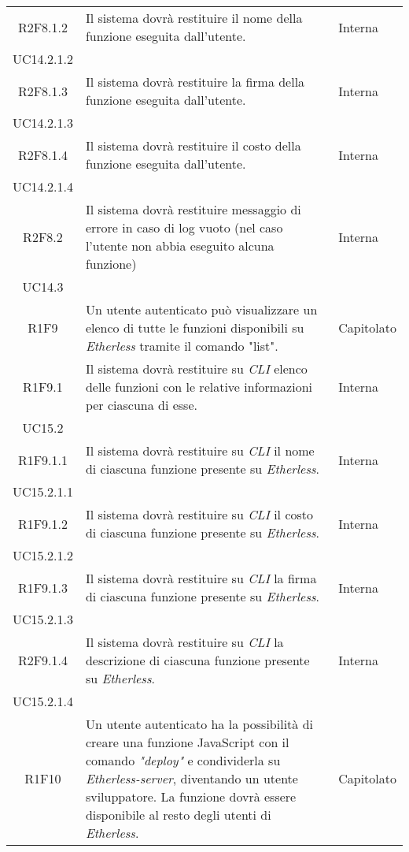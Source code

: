 \begin{longtable}{|c|p{8cm}|C{2cm}|}
	R2F8.1.2 &  Il sistema dovrà restituire il nome della funzione eseguita dall'utente. & \centering Interna \\ UC14.2.1.2 \tabularnewline

	R2F8.1.3 &  Il sistema dovrà restituire la firma della funzione eseguita dall'utente. & \centering Interna \\ UC14.2.1.3 \tabularnewline

	R2F8.1.4 &  Il sistema dovrà restituire il costo della funzione eseguita dall'utente. & \centering Interna \\ UC14.2.1.4 \tabularnewline

	R2F8.2 &  Il sistema dovrà restituire messaggio di errore in caso di log vuoto (nel caso l'utente non abbia eseguito alcuna funzione) & \centering Interna \\ UC14.3 \tabularnewline

	R1F9 &  Un utente autenticato può visualizzare un elenco di tutte le funzioni disponibili su \textit{Etherless} tramite il comando "list". & Capitolato \\

	R1F9.1 &  Il sistema dovrà restituire su \textit{CLI\glo} elenco delle funzioni con le relative informazioni per ciascuna di esse. & \centering Interna \\ UC15.2 \tabularnewline

	R1F9.1.1 &  Il sistema dovrà restituire su \textit{CLI\glo} il nome di ciascuna funzione presente su \textit{Etherless}. & \centering Interna \\ UC15.2.1.1 \tabularnewline

	R1F9.1.2 &  Il sistema dovrà restituire su \textit{CLI\glo} il costo di ciascuna funzione presente su \textit{Etherless}. & \centering Interna \\ UC15.2.1.2 \tabularnewline

	R1F9.1.3 &  Il sistema dovrà restituire su \textit{CLI\glo} la firma di ciascuna funzione presente su \textit{Etherless}. & \centering Interna \\ UC15.2.1.3 \tabularnewline

	R2F9.1.4 &  Il sistema dovrà restituire su \textit{CLI\glo} la descrizione di ciascuna funzione presente su \textit{Etherless}. & \centering Interna \\ UC15.2.1.4 \tabularnewline

	R1F10 &  Un utente autenticato ha la possibilità di creare una funzione JavaScript con il comando \textit{"deploy\glos"} e condividerla su \textit{Etherless-server}, diventando un utente sviluppatore. La funzione dovrà essere disponibile al resto degli utenti di \textit{Etherless}. & Capitolato \\


\end{longtable}
